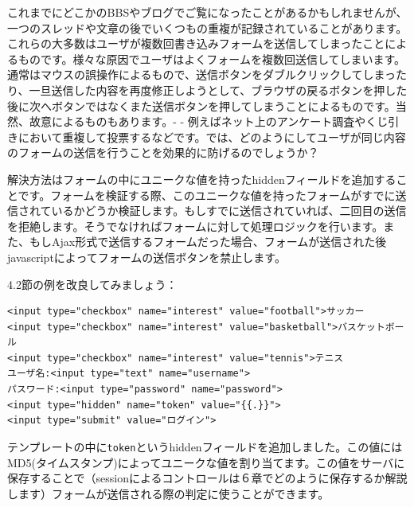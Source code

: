 これまでにどこかのBBSやブログでご覧になったことがあるかもしれませんが、一つのスレッドや文章の後でいくつもの重複が記録されていることがあります。これらの大多数はユーザが複数回書き込みフォームを送信してしまったことによるものです。様々な原因でユーザはよくフォームを複数回送信してしまいます。通常はマウスの誤操作によるもので、送信ボタンをダブルクリックしてしまったり、一旦送信した内容を再度修正しようとして、ブラウザの戻るボタンを押した後に次へボタンではなくまた送信ボタンを押してしまうことによるものです。当然、故意によるものもあります。- - 例えばネット上のアンケート調査やくじ引きにおいて重複して投票するなどです。では、どのようにしてユーザが同じ内容のフォームの送信を行うことを効果的に防げるのでしょうか？

解決方法はフォームの中にユニークな値を持ったhiddenフィールドを追加することです。フォームを検証する際、このユニークな値を持ったフォームがすでに送信されているかどうか検証します。もしすでに送信されていれば、二回目の送信を拒絶します。そうでなければフォームに対して処理ロジックを行います。また、もしAjax形式で送信するフォームだった場合、フォームが送信された後javascriptによってフォームの送信ボタンを禁止します。

4.2節の例を改良してみましょう：

\begin{lstlisting}[numbers=none]
<input type="checkbox" name="interest" value="football">サッカー
<input type="checkbox" name="interest" value="basketball">バスケットボール
<input type="checkbox" name="interest" value="tennis">テニス
ユーザ名:<input type="text" name="username">
パスワード:<input type="password" name="password">
<input type="hidden" name="token" value="{{.}}">
<input type="submit" value="ログイン">
\end{lstlisting}

テンプレートの中に\texttt{token}というhiddenフィールドを追加しました。この値にはMD5(タイムスタンプ)によってユニークな値を割り当てます。この値をサーバに保存することで（sessionによるコントロールは６章でどのように保存するか解説します）フォームが送信される際の判定に使うことができます。

